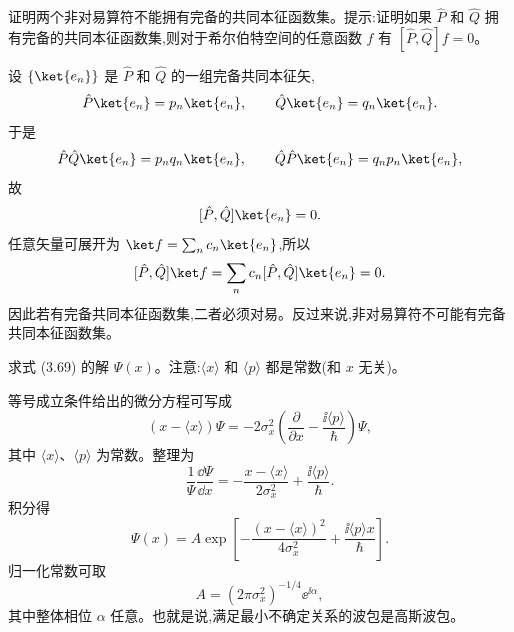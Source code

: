 \begin{question}
证明两个非对易算符不能拥有完备的共同本征函数集。提示:证明如果 $\hat P$ 和 $\hat Q$ 拥有完备的共同本征函数集,则对于希尔伯特空间的任意函数 $f$ 有 $[\hat P,\hat Q]f=0$。
\begin{solution}
设 $\{\ket{e_n}\}$ 是 $\hat P$ 和 $\hat Q$ 的一组完备共同本征矢,
\[
\hat P\ket{e_n}=p_n\ket{e_n},
\qquad
\hat Q\ket{e_n}=q_n\ket{e_n}.
\]
于是
\[
\hat P\hat Q\ket{e_n}=p_nq_n\ket{e_n},
\qquad
\hat Q\hat P\ket{e_n}=q_np_n\ket{e_n},
\]
故
\[
[\hat P,\hat Q]\ket{e_n}=0.
\]
任意矢量可展开为 $\ket f=\sum_n c_n\ket{e_n}$,所以
\[
[\hat P,\hat Q]\ket f=\sum_n c_n[\hat P,\hat Q]\ket{e_n}=0.
\]
因此若有完备共同本征函数集,二者必须对易。反过来说,非对易算符不可能有完备共同本征函数集。
\end{solution}
\end{question}

\begin{question}
求式 (3.69) 的解 $\Psi(x)$。注意:$\langle x\rangle$ 和 $\langle p\rangle$ 都是常数(和 $x$ 无关)。

\par\smallskip
{}

\begin{solution}
等号成立条件给出的微分方程可写成
\[
\left(x-\langle x\rangle\right)\Psi
=-2\sigma_x^2\left(\frac{\partial}{\partial x}-\frac{\ii\langle p\rangle}{\hbar}\right)\Psi,
\]
其中 $\langle x\rangle$、$\langle p\rangle$ 为常数。整理为
\[
\frac1\Psi\frac{\dd\Psi}{\dd x}
=-\frac{x-\langle x\rangle}{2\sigma_x^2}+\frac{\ii\langle p\rangle}{\hbar}.
\]
积分得
\[
\Psi(x)=A\exp\left[-\frac{(x-\langle x\rangle)^2}{4\sigma_x^2}
+\frac{\ii\langle p\rangle x}{\hbar}\right].
\]
归一化常数可取
\[
A=(2\pi\sigma_x^2)^{-1/4}\ee^{\ii\alpha},
\]
其中整体相位 $\alpha$ 任意。也就是说,满足最小不确定关系的波包是高斯波包。
\end{solution}
\end{question}

